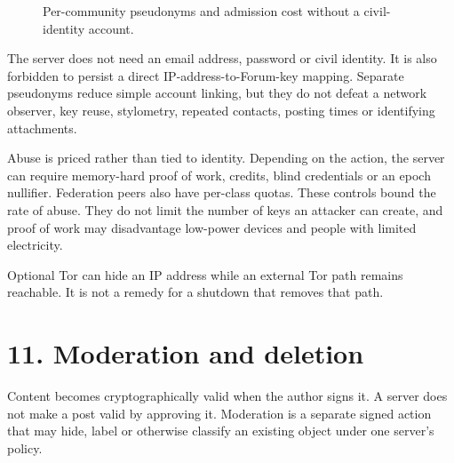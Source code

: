 \documentclass[12pt,a4paper]{article}
\begin{document}
\begin{figure}[H]\centering
{}
\caption{Per-community pseudonyms and admission cost without a civil-identity account.}
\end{figure}
The server does not need an email address, password or civil identity. It is also forbidden to persist a direct IP-address-to-Forum-key mapping. Separate pseudonyms reduce simple account linking, but they do not defeat a network observer, key reuse, stylometry, repeated contacts, posting times or identifying attachments.

Abuse is priced rather than tied to identity. Depending on the action, the server can require memory-hard proof of work, credits, blind credentials or an epoch nullifier. Federation peers also have per-class quotas. These controls bound the rate of abuse. They do not limit the number of keys an attacker can create, and proof of work may disadvantage low-power devices and people with limited electricity.

Optional Tor can hide an IP address while an external Tor path remains reachable. It is not a remedy for a shutdown that removes that path.

\section*{11. Moderation and deletion}
Content becomes cryptographically valid when the author signs it. A server does not make a post valid by approving it. Moderation is a separate signed action that may hide, label or otherwise classify an existing object under one server's policy.
\end{document}
